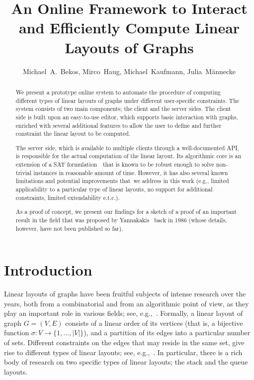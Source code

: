 \documentclass[runningheads]{llncs}
\author{Michael~A.~Bekos, Mirco~Haug, Michael~Kaufmann, Julia~M\"annecke}
\title{An Online Framework to Interact and Efficiently Compute Linear Layouts of Graphs}
\institute{
Institut f\"ur Informatik, Universit\"at T\"ubingen, T\"ubingen, Germany\\
\texttt{\{bekos,mk\}@informatik.uni-tuebingen.de}\\
\texttt{\{mirco.haug,julia.maennecke\}@student.uni-tuebingen.de}
}
\begin{document}
\maketitle
\linenumbers

\begin{abstract}
We present a prototype online system to automate the procedure of computing different types of linear layouts of graphs under different user-specific constraints. The system consists of two main components; the client and the server sides. The client side is built upon an easy-to-use editor, which supports basic interaction with graphs, enriched with several additional features to allow the user to define and further constraint the linear layout to be computed. 

The server side, which is available to multiple clients through a well-documented API, is responsible for the actual computation of the linear layout. Its algorithmic core is an extension of a SAT formulation~\cite{DBLP:conf/gd/Bekos0Z15}~that is known to be robust enough to solve non-trivial instances in reasonable amount of time. However, it  has also several known limitations and potential improvements that~we address in this work (e.g., limited applicability to a particular type of linear layouts, no support for additional constraints, limited extendability e.t.c.). 

As a proof of concept, we present our findings for a sketch of a proof of an important result in the field that was proposed by Yannakakis~\cite{DBLP:conf/stoc/Yannakakis86} back in 1986 (whose details, however, have not been published so far).
\end{abstract}

\section{Introduction}
\label{sec:introduction}

Linear layouts of graphs have been fruitful subjects of intense research over the years, both from a combinatorial and from an algorithmic point of view, as they play an important role in various fields; see, e.g.,~\cite{DBLP:journals/dmtcs/DujmovicW04}. Formally, a linear layout of graph $G=(V,E)$ consists of a linear order of its vertices (that is, a bijective function $\sigma: V \rightarrow \{1,\ldots,|V|\}$), and a partition of its edges into a particular number of sets. Different constraints on the edges that may reside in the same set, give rise to different types of linear layouts; see, e.g.,~\cite{DBLP:conf/wg/AlamBG0P18,DBLP:journals/ejc/BinucciGHL18,DBLP:journals/siamcomp/HeathR92,DBLP:conf/gd/Pupyrev17,DBLP:journals/jcss/Yannakakis89}. In particular, there is a rich body of research on two specific types of linear layouts; the stack and the queue layouts. 
\end{document}
